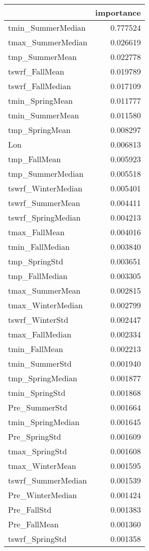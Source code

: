\begin{tabular}{lr}
\toprule
 & importance \\
\midrule
tmin_SummerMedian & 0.777524 \\
tmax_SummerMedian & 0.026619 \\
tmp_SummerMean & 0.022778 \\
tswrf_FallMean & 0.019789 \\
tswrf_FallMedian & 0.017109 \\
tmin_SpringMean & 0.011777 \\
tmin_SummerMean & 0.011580 \\
tmp_SpringMean & 0.008297 \\
Lon & 0.006813 \\
tmp_FallMean & 0.005923 \\
tmp_SummerMedian & 0.005518 \\
tswrf_WinterMedian & 0.005401 \\
tswrf_SummerMean & 0.004411 \\
tswrf_SpringMedian & 0.004213 \\
tmax_FallMean & 0.004016 \\
tmin_FallMedian & 0.003840 \\
tmp_SpringStd & 0.003651 \\
tmp_FallMedian & 0.003305 \\
tmax_SummerMean & 0.002815 \\
tmax_WinterMedian & 0.002799 \\
tswrf_WinterStd & 0.002447 \\
tmax_FallMedian & 0.002334 \\
tmin_FallMean & 0.002213 \\
tmin_SummerStd & 0.001940 \\
tmp_SpringMedian & 0.001877 \\
tmin_SpringStd & 0.001868 \\
Pre_SummerStd & 0.001664 \\
tmin_SpringMedian & 0.001645 \\
Pre_SpringStd & 0.001609 \\
tmax_SpringStd & 0.001608 \\
tmax_WinterMean & 0.001595 \\
tswrf_SummerMedian & 0.001539 \\
Pre_WinterMedian & 0.001424 \\
Pre_FallStd & 0.001383 \\
Pre_FallMean & 0.001360 \\
tswrf_SpringStd & 0.001358 \\

\end{tabular}
